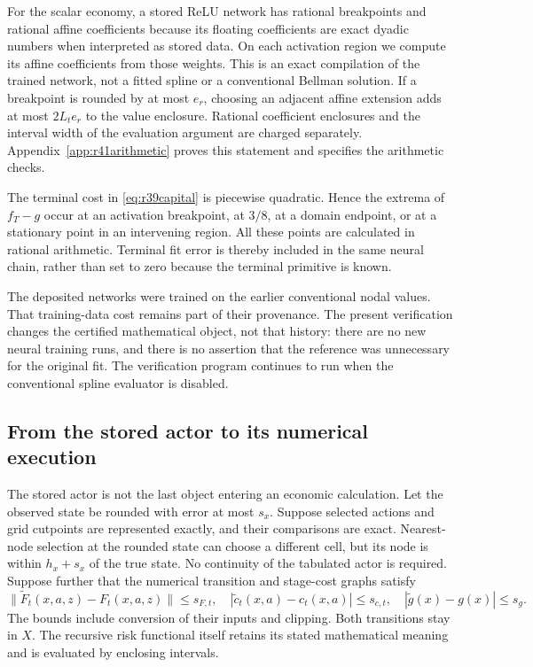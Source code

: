 \documentclass[ecta,nameyear,draft]{econsocart}
\theoremstyle{definition}
\theoremstyle{remark}
\begin{document}
For the scalar economy, a stored ReLU network has rational breakpoints and
rational affine coefficients because its floating coefficients are exact
dyadic numbers when interpreted as stored data. On each activation region
we compute its affine coefficients from those weights. This is an exact
compilation of the trained network, not a fitted spline or a conventional
Bellman solution. If a breakpoint is rounded by at most $e_r$, choosing an
adjacent affine extension adds at most $2L_te_r$ to the value enclosure.
Rational coefficient enclosures and the interval width of the evaluation
argument are charged separately. Appendix~\ref{app:r41arithmetic} proves
this statement and specifies the arithmetic checks.

The terminal cost in \eqref{eq:r39capital} is piecewise quadratic. Hence the
extrema of $f_T-g$ occur at an activation breakpoint, at $3/8$, at a domain
endpoint, or at a stationary point in an intervening region. All these
points are calculated in rational arithmetic. Terminal fit error is thereby
included in the same neural chain, rather than set to zero because the
terminal primitive is known.

The deposited networks were trained on the earlier conventional nodal
values. That training-data cost remains part of their provenance. The present
verification changes the certified mathematical object, not that history:
there are no new neural training runs, and there is no assertion that the
reference was unnecessary for the original fit. The verification program
continues to run when the conventional spline evaluator is disabled.

\subsection{From the stored actor to its numerical execution}
\label{sec:r41deployment}
The stored actor is not the last object entering an economic calculation.
Let the observed state be rounded with error at most $s_x$. Suppose selected
actions and grid cutpoints are represented exactly, and their comparisons
are exact. Nearest-node selection at the rounded state can choose a different
cell, but its node is within $h_x+s_x$ of the true state. No continuity of
the tabulated actor is required. Suppose further that the numerical
transition and stage-cost graphs satisfy
\[
 \|\widetilde F_t(x,a,z)-F_t(x,a,z)\|\leq s_{F,t},\quad
 |\widetilde c_t(x,a)-c_t(x,a)|\leq s_{c,t},\quad
 |\widetilde g(x)-g(x)|\leq s_g.
\]
The bounds include conversion of their inputs and clipping. Both transitions
stay in $X$. The recursive risk functional itself retains its stated
mathematical meaning and is evaluated by enclosing intervals.
\end{document}
